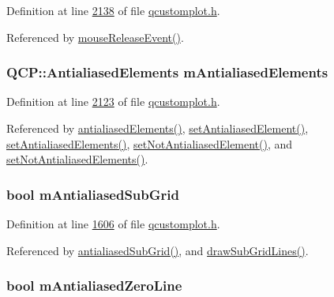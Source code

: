 Definition at line \hyperlink{a00116_source_l02138}{2138} of file \hyperlink{a00116_source}{qcustomplot.\+h}.



Referenced by \hyperlink{a00115_source_l07691}{mouse\+Release\+Event()}.

\hypertarget{a00116_a18feaee1080c45b74782bdbf0c252f89}{
\subsubsection[{m\+Antialiased\+Elements}]{\setlength{\rightskip}{0pt plus 5cm}Q\+C\+P\+::\+Antialiased\+Elements m\+Antialiased\+Elements}}\label{a00116_a18feaee1080c45b74782bdbf0c252f89}


Definition at line \hyperlink{a00116_source_l02123}{2123} of file \hyperlink{a00116_source}{qcustomplot.\+h}.



Referenced by \hyperlink{a00116_source_l01969}{antialiased\+Elements()}, \hyperlink{a00115_source_l06135}{set\+Antialiased\+Element()}, \hyperlink{a00115_source_l06112}{set\+Antialiased\+Elements()}, \hyperlink{a00115_source_l06191}{set\+Not\+Antialiased\+Element()}, and \hyperlink{a00115_source_l06165}{set\+Not\+Antialiased\+Elements()}.

\hypertarget{a00116_af55685e73eae391bbdfd4b2eec8484af}{
\subsubsection[{m\+Antialiased\+Sub\+Grid}]{\setlength{\rightskip}{0pt plus 5cm}bool m\+Antialiased\+Sub\+Grid}}\label{a00116_af55685e73eae391bbdfd4b2eec8484af}


Definition at line \hyperlink{a00116_source_l01606}{1606} of file \hyperlink{a00116_source}{qcustomplot.\+h}.



Referenced by \hyperlink{a00116_source_l01589}{antialiased\+Sub\+Grid()}, and \hyperlink{a00115_source_l14331}{draw\+Sub\+Grid\+Lines()}.

\hypertarget{a00116_a52a4de0f44b2192ad7b97ce66e265649}{
\subsubsection[{m\+Antialiased\+Zero\+Line}]{\setlength{\rightskip}{0pt plus 5cm}bool m\+Antialiased\+Zero\+Line}}\label{a00116_a52a4de0f44b2192ad7b97ce66e265649}


